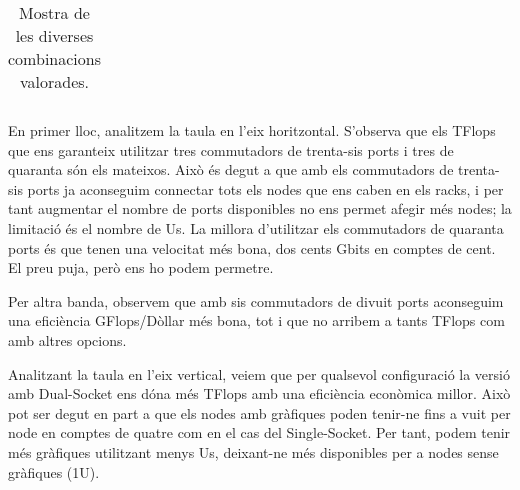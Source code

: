 \begin{table}[H]
\begin{adjustwidth}{-1.0in}{-1.0in}
\begin{center}
\begin{tabular}{llc|c|c|c}
\end{tabular}
\caption{Mostra de les diverses combinacions valorades.}
\end{center}
\end{adjustwidth}
\end{table}

En primer lloc, analitzem la taula en l'eix horitzontal. S'observa que els TFlops que ens garanteix utilitzar tres commutadors de trenta-sis ports i tres de quaranta són els mateixos. Això és degut a que amb els commutadors de trenta-sis ports ja aconseguim connectar tots els nodes que ens caben en els racks, i per tant augmentar el nombre de ports disponibles no ens permet afegir més nodes; la limitació és el nombre de Us. La millora d'utilitzar els commutadors de quaranta ports és que tenen una velocitat més bona, dos cents Gbits en comptes de cent. El preu puja, però ens ho podem permetre.

Per altra banda, observem que amb sis commutadors de divuit ports aconseguim una eficiència GFlops/Dòllar més bona, tot i que no arribem a tants TFlops com amb altres opcions.

Analitzant la taula en l'eix vertical, veiem que per qualsevol configuració la versió amb Dual-Socket ens dóna més TFlops amb una eficiència econòmica millor. Això pot ser degut en part a que els nodes amb gràfiques poden tenir-ne fins a vuit per node en comptes de quatre com en el cas del Single-Socket. Per tant, podem tenir més gràfiques utilitzant menys Us, deixant-ne més disponibles per a nodes sense gràfiques (1U).


